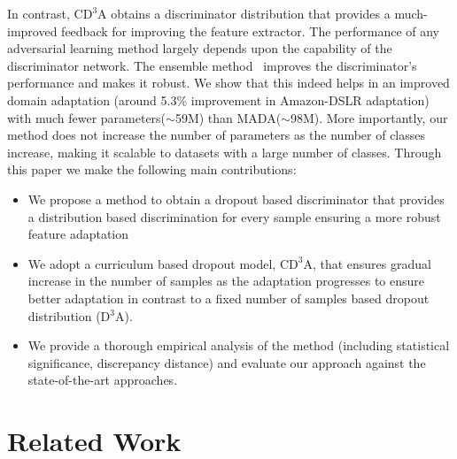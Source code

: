 \documentclass{bmvc2k}
\begin{document}
In contrast, C$\text{D}^{3}$A obtains a discriminator distribution that provides a much-improved feedback for improving the feature extractor. The performance of any adversarial learning method largely depends upon the capability of the discriminator network. The ensemble method~\cite{hara2016analysis} improves the discriminator's performance and makes it robust. We show that this indeed helps in an improved domain adaptation (around 5.3\% improvement in Amazon-DSLR adaptation) with much fewer parameters($\sim
$59M) than MADA($\sim$98M). More importantly, our method does not increase the number of parameters as the number of classes increase, making it scalable to datasets with a large number of classes. Through this paper we make the following main contributions:



\begin{itemize}
\item We propose a method to obtain a dropout based discriminator that provides a distribution based discrimination for every sample ensuring a more robust feature adaptation
\item We adopt a curriculum based dropout model, C$\text{D}^{3}$A, that ensures gradual increase in the number of samples as the adaptation progresses to ensure better adaptation in contrast to a fixed number of samples based dropout distribution (D$^{3}$A).
\item We provide a thorough empirical analysis of the method (including statistical significance, discrepancy distance) and evaluate our approach against the state-of-the-art approaches.
\end{itemize}



















\section{Related Work}
\end{document}

